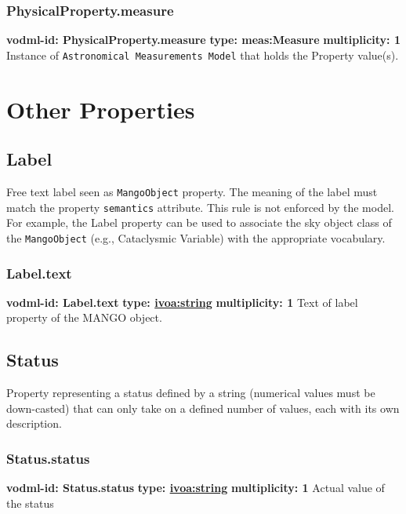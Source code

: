     \subsubsection{PhysicalProperty.measure}
    \textbf{vodml-id: PhysicalProperty.measure} \newline
    \textbf{type: meas:Measure} \newline
    \textbf{multiplicity: 1} \newline
    Instance of \texttt{Astronomical Measurements Model} that holds the Property value(s).

\section{Other Properties}

  \subsection{Label}
    \label{sect:Label}
    Free text label seen as \texttt{MangoObject} property. The meaning of the label must match the property \texttt{semantics} attribute. This rule is not enforced by the model. For example, the Label property can be used to associate the sky object class of the \texttt{MangoObject} (e.g., Cataclysmic Variable) with the appropriate vocabulary.

    \subsubsection{Label.text}
    \textbf{vodml-id: Label.text} \newline
    \textbf{type: \hyperref[sect:ivoa]{ivoa:string}} \newline
    \textbf{multiplicity: 1} \newline
    Text of label property of the MANGO object.

  \subsection{Status}
    \label{sect:Status}
    Property representing a status defined by a string (numerical values must be down-casted) that can only take on a defined number of values, each with its own description.

    \subsubsection{Status.status}
    \textbf{vodml-id: Status.status} \newline
    \textbf{type: \hyperref[sect:ivoa]{ivoa:string}} \newline
    \textbf{multiplicity: 1} \newline
    Actual value of the status

